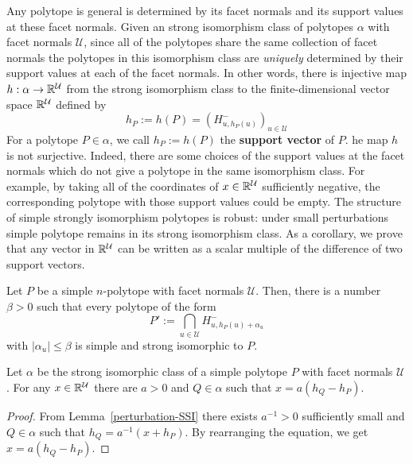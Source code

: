 \documentclass{puthesis-UG}
\begin{document}
Any polytope is general is determined by its facet normals and its support values at these facet normals. Given an strong isomorphism class of polytopes $\alpha$ with facet normals $\mathcal{U}$, since all of the polytopes share the same collection of facet normals the polytopes in this isomorphism class are \textit{uniquely} determined by their support values at each of the facet normals. In other words, there is injective map $h : \alpha \to \mathbb{R}^\mathcal{U}$ from the strong isomorphism class to the finite-dimensional vector space $\mathbb{R}^{\mathcal{U}}$ defined by 
\[
	h_P := h(P) = \left ( H^-_{u, h_P(u)}\right )_{u \in \mathcal{U}}
\]
For a polytope $P \in \alpha$, we call $h_P := h(P)$ the \textbf{support vector} of $P$. he map $h$ is not surjective. Indeed, there are some choices of the support values at the facet normals which do not give a polytope in the same isomorphism class. For example, by taking all of the coordinates of $x \in \mathbb{R}^{\mathcal{U}}$ sufficiently negative, the corresponding polytope with those support values could be empty. The structure of simple strongly isomorphism polytopes is robust: under small perturbations simple polytope remains in its strong isomorphism class. As a corollary, we prove that any vector in $\mathbb{R}^{\mathcal{U}}$ can be written as a scalar multiple of the difference of two support vectors. 

\begin{lem} \label{perturbation-SSI}
	Let $P$ be a simple $n$-polytope with facet normals $\mathcal{U}$. Then, there is a number $\beta > 0$ such that every polytope of the form 
	\[
		P' := \bigcap_{u \in \mathcal{U}} H_{u, h_P(u) + \alpha_u}^-
	\]
	with $|\alpha_u| \leq \beta$ is simple and strong isomorphic to $P$. 
\end{lem}

\begin{cor} \label{difference-of-support-vectors}
	Let $\alpha$ be the strong isomorphic class of a simple polytope $P$ with facet normals $\mathcal{U}$. For any $x \in \mathbb{R}^{\mathcal{U}}$ there are $a > 0$ and $Q \in \alpha$ such that $x = a (h_Q - h_P)$. 
\end{cor}

\begin{proof}
	From Lemma~\ref{perturbation-SSI} there exists $a^{-1} > 0$ sufficiently small and $Q \in \alpha$ such that $h_Q = a^{-1}(x + h_P)$. By rearranging the equation, we get $x = a(h_Q - h_P)$. 
\end{proof}
\end{document}

